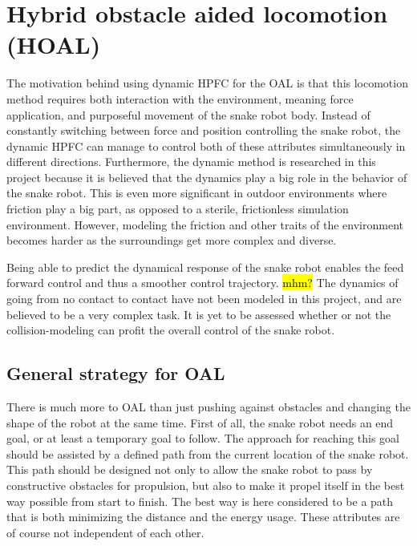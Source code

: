 \section{Hybrid obstacle aided locomotion (HOAL)}\label{sec:dhpfc-oal}

The motivation behind using dynamic HPFC for the OAL is that this locomotion method requires both interaction with the environment, meaning force application, and purposeful movement of the snake robot body. Instead of constantly switching between force and position controlling the snake robot, the dynamic HPFC can manage to control both of these attributes simultaneously in different directions. Furthermore, the dynamic method is researched in this project because it is believed that the dynamics play a big role in the behavior of the snake robot. This is even more significant in outdoor environments where friction play a big part, as opposed to a sterile, frictionless simulation environment. However, modeling the friction and other traits of the environment becomes harder as the surroundings get more complex and diverse.

Being able to predict the dynamical response of the snake robot enables the feed forward control and thus a smoother control trajectory. \hl{mhm?}
The dynamics of going from no contact to contact have not been modeled in this project, and are believed to be a very complex task. It is yet to be assessed whether or not the collision-modeling can profit the overall control of the snake robot.

\subsection{General strategy for OAL}

There is much more to OAL than just pushing against obstacles and changing the shape of the robot at the same time. First of all, the snake robot needs an end goal, or at least a temporary goal to follow. The approach for reaching this goal should be assisted by a defined path from the current location of the snake robot. This path should be designed not only to allow the snake robot to pass by constructive obstacles for propulsion, but also to make it propel itself in the best way possible from start to finish. The best way is here considered to be a path that is both minimizing the distance and the energy usage. These attributes are of course not independent of each other.


